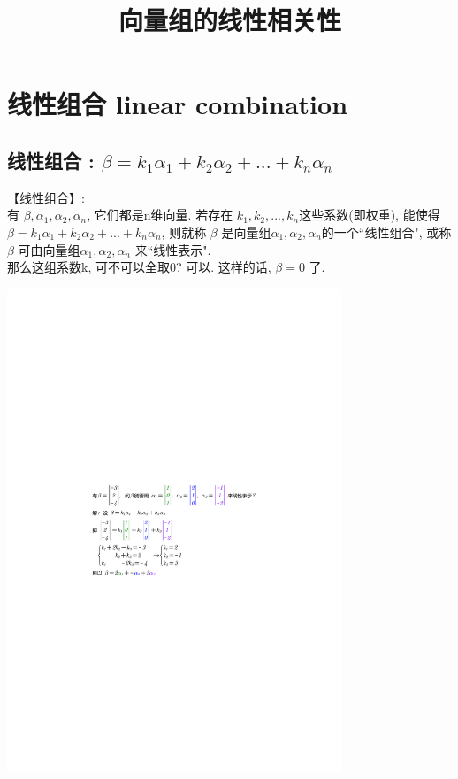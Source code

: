 \documentclass[UTF8]{ctexart}
\title{向量组的线性相关性}
\begin{document}
\tableofcontents %
\date{} %
\maketitle  %




\section{线性组合 linear combination}

\subsection{线性组合 : $\beta =k_1\alpha _1+k_2\alpha _2+...+k_n\alpha _n$ }

【线性组合】: \\
有 $ \beta, \alpha_1, \alpha_2, \alpha_n$, 它们都是n维向量. 若存在 $k_1, k_2, ..., k_n$这些系数(即权重), 能使得 $\beta =k_1\alpha _1+k_2\alpha _2+...+k_n\alpha _n$, 则就称 $\beta$ 是向量组$\alpha_1, \alpha_2, \alpha_n$的一个``线性组合", 或称 $\beta$ 可由向量组$\alpha_1, \alpha_2, \alpha_n$ 来``线性表示". \\

那么这组系数k, 可不可以全取0? 可以. 这样的话,  $\beta=0$ 了. \\


\begin{myEnvSample}
	\includegraphics[width=0.75\textwidth]{img/0101.pdf}
\end{myEnvSample}
\end{document}
